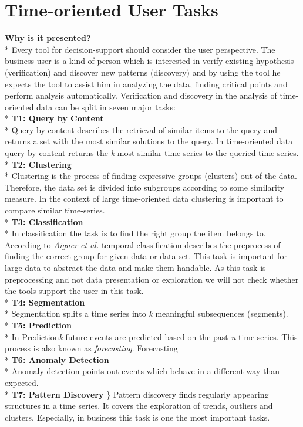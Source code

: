 \section{Time-oriented User Tasks} \label{tasks}
\textbf{Why is it presented?}\\*
Every tool for decision-support should consider the user perspective. The business user is a kind of person which is interested in verify existing hypothesis (verification) and discover new patterns (discovery) and by using the tool he expects the tool to assist him in analyzing the data, finding critical points and perform analysis automatically\cite{Brachman1996}. Verification and discovery in the analysis of time-oriented data can be split in seven major tasks\cite{Esling2012}:\\*
\textbf{T1: Query by Content}
\\*
Query by content describes the retrieval of similar items to the query and returns a set with the most similar solutions to the query. In time-oriented data query by content returns the \textit{k} most similar time series to the queried time series.
\\*
\textbf{T2: Clustering}\\*
Clustering is the process of finding expressive groups (clusters) out of the data. Therefore, the data set is divided into subgroups according to some similarity measure. In the context of large time-oriented data clustering is important to compare similar time-series.
\\*
\textbf{T3: Classification}\\*
In classification the task is to find the right group the item belongs to. According to \textit{Aigner et al.} temporal classification describes the preprocess of finding the correct group for given data or data set. This task is important for large data to abstract the data and make them handable. As this task is preprocessing and not data presentation or exploration we will not check whether the tools support the user in this task. 
\\*
\textbf{T4: Segmentation}\\*
Segmentation splits a time series into \textit{k} meaningful subsequences (segments)\cite{batyrshin2007perception}. 
\\*
\textbf{T5: Prediction}\\*
In Prediction\textit{k} future events are predicted based on the past \textit{n} time series. This process is also known as \textit{forecasting}. Forecasting 
\\*
\textbf{T6: Anomaly Detection} \\*
Anomaly detection points out events which behave in a different way than expected.
\\*
\textbf{T7: Pattern Discovery} \}\*
Pattern discovery finds regularly appearing structures in a time series.  It covers the exploration of trends, outliers and clusters. Especially, in business this task is one the most important tasks.


